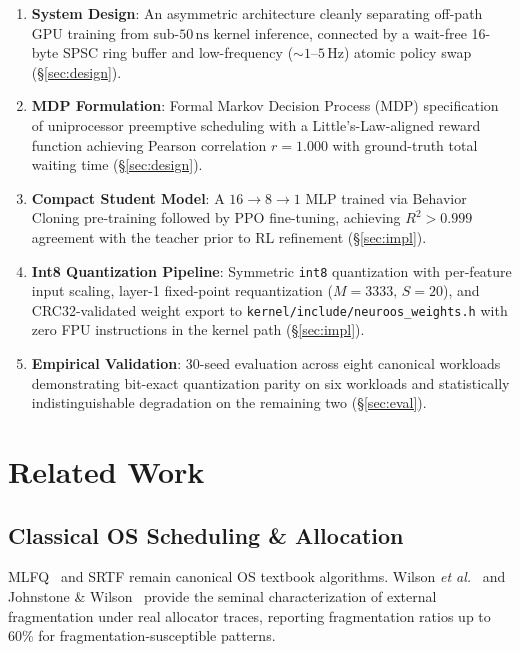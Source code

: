 \begin{enumerate}
  \item \textbf{System Design}: An asymmetric architecture cleanly separating
    off-path GPU training from sub-$50\,\text{ns}$ kernel inference, connected
    by a wait-free 16-byte SPSC ring buffer and low-frequency ($\sim 1\text{--}5\,\text{Hz}$)
    atomic policy swap (\S\ref{sec:design}).

  \item \textbf{MDP Formulation}: Formal Markov Decision Process (MDP)
    specification of uniprocessor preemptive scheduling with a
    Little's-Law-aligned reward function achieving Pearson correlation
    $r = 1.000$ with ground-truth total waiting time (\S\ref{sec:design}).

  \item \textbf{Compact Student Model}: A $16\to 8\to 1$ MLP trained via
    Behavior Cloning pre-training followed by PPO fine-tuning, achieving
    $R^2 > 0.999$ agreement with the teacher prior to RL refinement
    (\S\ref{sec:impl}).

  \item \textbf{Int8 Quantization Pipeline}: Symmetric \texttt{int8}
    quantization with per-feature input scaling, layer-1 fixed-point
    requantization ($M = 3333,\,S = 20$), and CRC32-validated weight export to
    \texttt{kernel/include/neuroos\_weights.h} with zero FPU instructions in
    the kernel path (\S\ref{sec:impl}).

  \item \textbf{Empirical Validation}: 30-seed evaluation across eight canonical
    workloads demonstrating bit-exact quantization parity on six workloads and
    statistically indistinguishable degradation on the remaining two
    (\S\ref{sec:eval}).
\end{enumerate}

\section{Related Work}
\label{sec:related}

\subsection{Classical OS Scheduling \& Allocation}

MLFQ~\cite{Corbato1962} and SRTF remain canonical OS textbook algorithms.
Wilson \textit{et al.}~\cite{Wilson1995} and Johnstone \&
Wilson~\cite{Johnstone1998} provide the seminal characterization of external
fragmentation under real allocator traces, reporting fragmentation ratios up to
$60\%$ for fragmentation-susceptible patterns.

